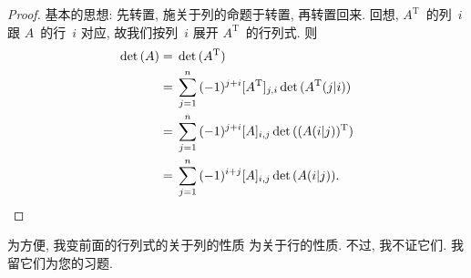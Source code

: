 \documentclass[../libro.tex]{subfiles}
\begin{document}
\begin{proof}
    基本的思想:
    先转置,
    施关于列的命题于转置,
    再转置回来.
    回想,
    \(A^{\mathrm{T}}\)~的列~\(i\)
    跟 \(A\)~的行~\(i\) 对应,
    故我们按列~\(i\) 展开 \(A^{\mathrm{T}}\)~的行列式.
    则
    \begin{align*}
        \det {(A)}
        = {} & \det {(A^{\mathrm{T}})}
        \\
        = {} & \sum_{j = 1}^{n}
        {(-1)^{j+i} [A^{\mathrm{T}}]_{j,i}
            \det {(A^{\mathrm{T}}(j|i))}
        }
        \\
        = {} & \sum_{j = 1}^{n}
        {(-1)^{j+i} [A]_{i,j}
            \det {((A(i|j))^{\mathrm{T}})}
        }
        \\
        = {} & \sum_{j = 1}^{n}
        {(-1)^{i+j} [A]_{i,j}
            \det {(A(i|j))}
        }.
        \qedhere
    \end{align*}
\end{proof}

为方便,
我变前面的行列式的关于列的性质%
为关于行的性质.
不过, 我不证它们.
我留它们为您的习题.
\end{document}
